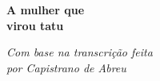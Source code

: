 \thispagestyle{empty}








\begingroup\thispagestyle{empty}\vspace*{.05\textheight} 

              {\formular
              \huge
              \noindent
              \textbf{A mulher que\\
              virou tatu}\\ 
              
              \vspace{-0.5cm}
              
              }

              \vspace{0.5cm}

              \noindent{}\textit{Com base na transcrição feita\\ por Capistrano de Abreu}

\endgroup
\vfill
\pagebreak